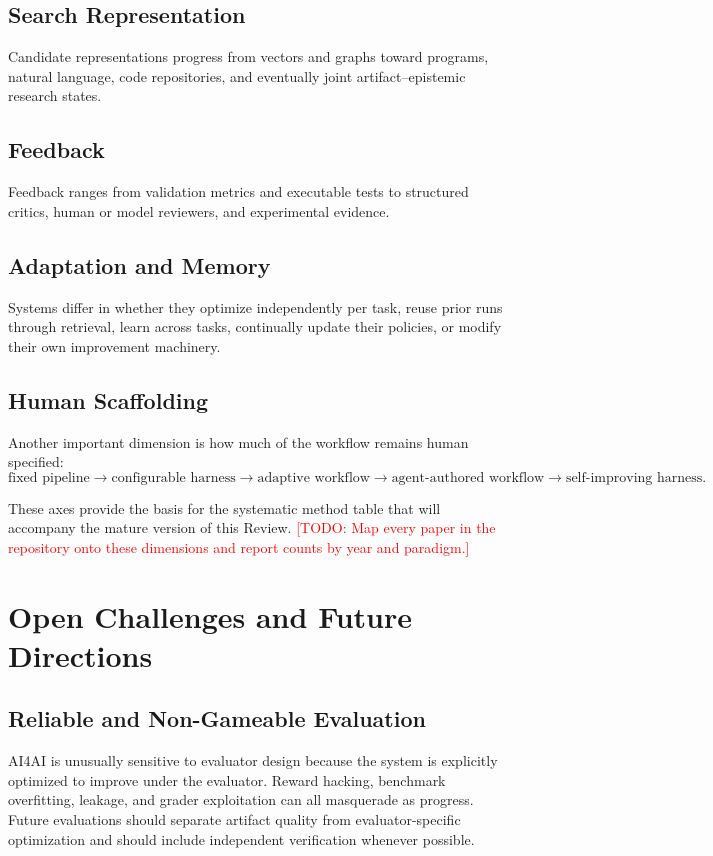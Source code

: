 \documentclass[journal]{IEEEtran}
\newcommand{\TODO}[1]{\textcolor{red}{[TODO: #1]}}
\begin{document}
\subsection{Search Representation}
Candidate representations progress from vectors and graphs toward programs, natural language, code repositories, and eventually joint artifact--epistemic research states.

\subsection{Feedback}
Feedback ranges from validation metrics and executable tests to structured critics, human or model reviewers, and experimental evidence.

\subsection{Adaptation and Memory}
Systems differ in whether they optimize independently per task, reuse prior runs through retrieval, learn across tasks, continually update their policies, or modify their own improvement machinery.

\subsection{Human Scaffolding}
Another important dimension is how much of the workflow remains human specified:
\begin{equation*}
\text{fixed pipeline}\rightarrow\text{configurable harness}\rightarrow\text{adaptive workflow}\rightarrow\text{agent-authored workflow}\rightarrow\text{self-improving harness}.
\end{equation*}

These axes provide the basis for the systematic method table that will accompany the mature version of this Review. \TODO{Map every paper in the repository onto these dimensions and report counts by year and paradigm.}

\section{Open Challenges and Future Directions}
\label{sec:challenges}

\subsection{Reliable and Non-Gameable Evaluation}
AI4AI is unusually sensitive to evaluator design because the system is explicitly optimized to improve under the evaluator. Reward hacking, benchmark overfitting, leakage, and grader exploitation can all masquerade as progress. Future evaluations should separate artifact quality from evaluator-specific optimization and should include independent verification whenever possible.
\end{document}
